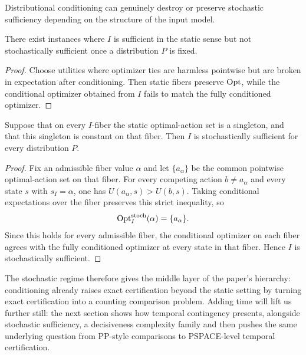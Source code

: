 Distributional conditioning can genuinely destroy or preserve stochastic sufficiency depending on the structure of the input model.

\begin{proposition}\label{prop:static-not-stochastic}
There exist instances where $I$ is sufficient in the static sense but not stochastically sufficient once a distribution $P$ is fixed.
\end{proposition}


\begin{proof}
Choose utilities where optimizer ties are harmless pointwise but are broken in expectation after conditioning. Then static fibers preserve $\mathrm{Opt}$, while the conditional optimizer obtained from $I$ fails to match the fully conditioned optimizer.
\end{proof}

\begin{proposition}\label{prop:static-to-stochastic-product}
Suppose that on every $I$-fiber the static optimal-action set is a singleton, and that this singleton is constant on that fiber. Then $I$ is stochastically sufficient for every distribution $P$.
\end{proposition}


\begin{proof}
Fix an admissible fiber value $\alpha$ and let $\{a_\alpha\}$ be the common pointwise optimal-action set on that fiber. For every competing action $b \ne a_\alpha$ and every state $s$ with $s_I=\alpha$, one has $U(a_\alpha,s) > U(b,s)$. Taking conditional expectations over the fiber preserves this strict inequality, so
\[
\mathrm{Opt}^{\mathrm{stoch}}_I(\alpha)=\{a_\alpha\}.
\]
Since this holds for every admissible fiber, the conditional optimizer on each fiber agrees with the fully conditioned optimizer at every state in that fiber. Hence $I$ is stochastically sufficient.
\end{proof}

The stochastic regime therefore gives the middle layer of the paper's hierarchy:
conditioning already raises exact certification beyond the static setting by
turning exact certification into a counting comparison problem. Adding time
will lift us further still: the next section shows how temporal contingency
presents, alongside stochastic sufficiency, a decisiveness complexity family and then pushes the same underlying question from PP-style comparisons to
PSPACE-level temporal certification.
